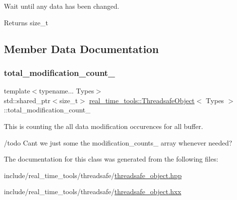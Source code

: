Wait until any data has been changed. 

\begin{DoxyReturn}{Returns}
size\+\_\+t 
\end{DoxyReturn}


\subsection{Member Data Documentation}
\mbox{\label{classreal__time__tools_1_1ThreadsafeObject_a12f866f5a2f955aa3b55b03623033fca}} 
\subsubsection{\texorpdfstring{total\+\_\+modification\+\_\+count\+\_\+}{total\_modification\_count\_}}
{\footnotesize\ttfamily template$<$typename... Types$>$ \\
std\+::shared\+\_\+ptr$<$size\+\_\+t$>$ \hyperlink{classreal__time__tools_1_1ThreadsafeObject}{real\+\_\+time\+\_\+tools\+::\+Threadsafe\+Object}$<$ Types $>$\+::total\+\_\+modification\+\_\+count\+\_\+\hspace{0.3cm}{\ttfamily [private]}}



This is counting the all data modification occurences for all buffer. 

/todo Can\textquotesingle{}t we just some the modification\+\_\+counts\+\_\+ array whenever needed? 

The documentation for this class was generated from the following files\+:\begin{DoxyCompactItemize}
\item 
include/real\+\_\+time\+\_\+tools/threadsafe/\hyperlink{threadsafe__object_8hpp}{threadsafe\+\_\+object.\+hpp}\item 
include/real\+\_\+time\+\_\+tools/threadsafe/\hyperlink{threadsafe__object_8hxx}{threadsafe\+\_\+object.\+hxx}\end{DoxyCompactItemize}
